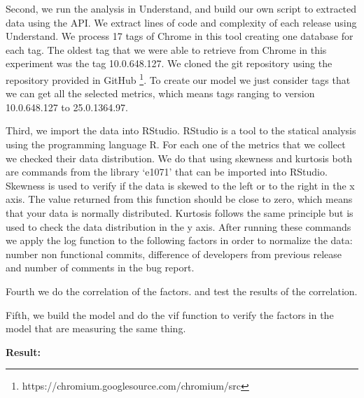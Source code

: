 Second, we run the analysis in Understand, and build our own script to extracted data using the API. We extract lines of code and complexity of each release using Understand. We process 17 tags of Chrome in this tool creating one database for each tag. The oldest tag that we were able to retrieve from Chrome in this experiment was the tag 10.0.648.127. We cloned the git repository using the repository provided in GitHub \footnote{https://chromium.googlesource.com/chromium/src}. To create our model we just consider tags that we can get all the selected metrics, which means tags ranging to version 10.0.648.127 to 25.0.1364.97.

Third, we import the data into RStudio. RStudio is a tool to the statical analysis using the programming language R. For each one of the metrics that we collect we checked their data distribution. We do that using skewness and kurtosis both are commands from the library `e1071' that can be imported into RStudio. Skewness is used to verify if the data is skewed to the left or to the right in the x axis. The value returned from this function should be close to zero, which means that your data is normally distributed. Kurtosis follows the same principle but is used to check the data distribution in the y axis. After running these commands we apply the log function to the following factors in order to normalize the data: number non functional commits, difference of developers from previous release and number of comments in the bug report. 

Fourth we do the correlation of the factors. and test the results of the correlation.

Fifth, we build the model and do the vif function to verify the factors in the model that are measuring the same thing. 
 
\vspace{1mm}
\noindent\textbf{Result:}

